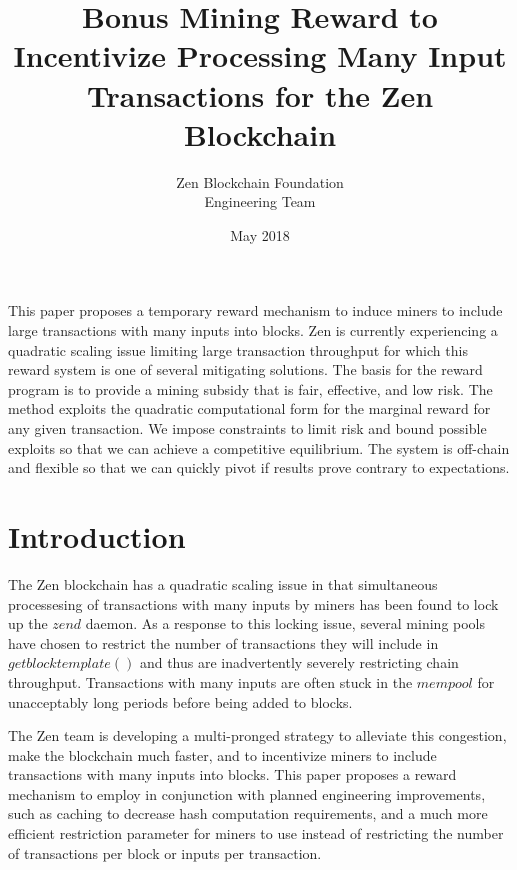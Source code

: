 \documentclass[11pt, oneside]{article}   	%
\title{Bonus Mining Reward to Incentivize Processing Many Input Transactions for the Zen Blockchain \\ }
\author{Zen Blockchain Foundation \\ Engineering Team}
\date{May 2018}							%
\begin{document}
\maketitle
\vspace{75 mm}
\begin{abstract}

\end{abstract}
This paper proposes a temporary reward mechanism to induce miners to include large transactions with many inputs into blocks. Zen is currently experiencing a quadratic scaling issue limiting large transaction throughput for which this reward system is one of several mitigating solutions. The basis for the reward program is to provide a mining subsidy that is fair, effective, and low risk. The method exploits the quadratic computational form for the marginal reward for any given transaction. We impose constraints to limit risk and bound possible exploits so that we can achieve a competitive equilibrium. The system is off-chain and flexible so that we can quickly pivot if results prove contrary to expectations. 

\newpage
\section{Introduction}
The Zen blockchain has a quadratic scaling issue in that simultaneous processesing of transactions with many inputs by miners has been found to lock up the $zend$ daemon. As a response to this locking issue, several mining pools have chosen to restrict the number of transactions they will include in $getblocktemplate()$ and thus are inadvertently severely restricting chain throughput. Transactions with many inputs are often stuck in the $mempool$ for unacceptably long periods before being added to blocks.    

The Zen team is developing a multi-pronged strategy to alleviate this congestion, make the blockchain much faster, and to incentivize miners to include transactions with many inputs into blocks. This paper proposes a reward mechanism to employ in conjunction with planned engineering improvements, such as caching to decrease hash computation requirements, and a much more efficient restriction parameter for miners to use instead of restricting the number of transactions per block or inputs per transaction. 
\end{document}
